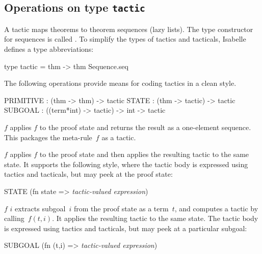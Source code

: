 \subsection{Operations on type {\tt tactic}}
A tactic maps theorems to theorem sequences (lazy lists).  The type
constructor for sequences is called .  To simplify the
types of tactics and tacticals, Isabelle defines a type abbreviations:
\begin{ttbox} 
type tactic = thm -> thm Sequence.seq
\end{ttbox} 
The following operations provide means for coding tactics in a clean style.
\begin{ttbox} 
PRIMITIVE :                  (thm -> thm) -> tactic  
STATE     :               (thm -> tactic) -> tactic
SUBGOAL   : ((term*int) -> tactic) -> int -> tactic
\end{ttbox} 
\begin{ttdescription}
\item[\ttindexbold{PRIMITIVE} $f$] 
applies $f$ to the proof state and returns the result as a
one-element sequence.  This packages the meta-rule~$f$ as a tactic.

\item[\ttindexbold{STATE} $f$] 
applies $f$ to the proof state and then applies the resulting tactic to the
same state.  It supports the following style, where the tactic body is
expressed using tactics and tacticals, but may peek at the proof state:
\begin{ttbox} 
STATE (fn state => {\it tactic-valued expression})
\end{ttbox} 

\item[\ttindexbold{SUBGOAL} $f$ $i$] 
extracts subgoal~$i$ from the proof state as a term~$t$, and computes a
tactic by calling~$f(t,i)$.  It applies the resulting tactic to the same
state.  The tactic body is expressed using tactics and tacticals, but may
peek at a particular subgoal:
\begin{ttbox} 
SUBGOAL (fn (t,i) => {\it tactic-valued expression})
\end{ttbox} 
\end{ttdescription}


